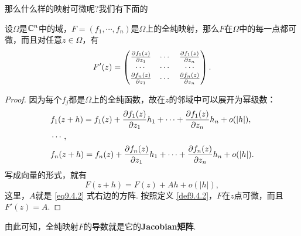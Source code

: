 那么什么样的映射可微呢?我们有下面的
\begin{theorem}\label{thm9.4.3}
设$\Omega$是$\mathbb C^n$中的域，$F=(f_1,\cdots,f_n)$是$\Omega$上的全纯映射，那么$F$在$\Omega$中的每一点都可微，而且对任意$z\in\Omega$，有
\begin{equation}\label{eq9.4.2}
F'(z)=\begin{pmatrix}
\frac{\partial f_1(z)}{\partial z_1}&\cdots&\frac{\partial f_1(z)}{\partial z_n}\\
\cdots&\cdots&\cdots\\
\frac{\partial f_n(z)}{\partial z_1}&\cdots&\frac{\partial f_n(z)}{\partial z_n}
\end{pmatrix}.
\end{equation}
\end{theorem}
\begin{proof}
因为每个$f_j$都是$\Omega$上的全纯函数，故在$z$的邻域中可以展开为幂级数：
\begin{align*}
&f_1(z+h)=f_1(z)+\frac{\partial f_1(z)}{\partial z_1}h_1+\cdots+\frac{\partial f_1(z)}{\partial z_n}h_n+o(|h|),\\
&\cdots,\\
&f_n(z+h)=f_n(z)+\frac{\partial f_n(z)}{\partial z_1}h_1+\cdots+\frac{\partial f_n(z)}{\partial z_n}h_n+o(|h|).
\end{align*}
写成向量的形式，就有
\[F(z+h)=F(z)+Ah+o(|h|),\]
这里，$A$就是 \eqref{eq9.4.2} 式右边的方阵. 按照定义 \ref{def9.4.2}，$F$在$z$点可微，而且$F'(z)=A$.
\end{proof}

由此可知，全纯映射$F$的导数就是它的\textbf{Jacobian矩阵}.

